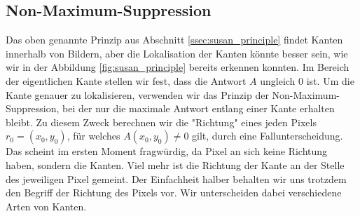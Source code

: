 \documentclass[a4paper, 11pt]{report}
\theoremstyle{definition}
\begin{document}
		\subsection{Non-Maximum-Suppression}\label{ssec:nonmax}
			Das oben genannte Prinzip aus Abschnitt \ref{ssec:susan_principle} findet Kanten innerhalb von Bildern, aber die Lokalisation der Kanten könnte besser sein, wie wir in der Abbildung \ref{fig:susan_principle} bereits erkennen konnten. Im Bereich der eigentlichen Kante stellen wir fest, dass die Antwort $A$ ungleich $0$ ist. Um die Kante genauer zu lokalisieren, verwenden wir das Prinzip der Non-Maximum-Suppression, bei der nur die maximale Antwort entlang einer Kante erhalten bleibt.
			Zu diesem Zweck berechnen wir die "Richtung" eines jeden Pixels $r_0 = (x_0, y_0)$, für welches $A(x_0, y_0) \neq 0$ gilt, durch eine Fallunterscheidung. Das scheint im ersten Moment fragwürdig, da Pixel an sich keine Richtung haben, sondern die Kanten. Viel mehr ist die Richtung der Kante an der Stelle des jeweiligen Pixel gemeint. Der Einfachheit halber behalten wir uns trotzdem den Begriff der Richtung des Pixels vor. Wir unterscheiden dabei verschiedene Arten von Kanten.
\end{document}
